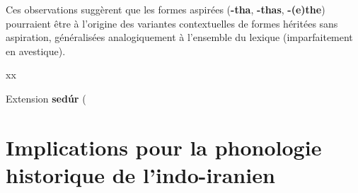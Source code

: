 \documentclass[oneside,a4paper,11pt]{article}
\newcommand{\ipa}[1]{{\phon\mbox{\textbf{#1}}}}
\begin{document}
Ces observations suggèrent que les formes aspirées (\ipa{-tha}, \ipa{-thas}, \ipa{-(e)the}) pourraient être à l'origine des variantes contextuelles de formes héritées sans aspiration, généralisées analogiquement à l'ensemble du lexique (imparfaitement en avestique).

xx

Extension \ipa{sedúr} (\citealt[342-3]{burrow55skt}
\section{Implications pour la phonologie historique de l'indo-iranien}





\end{document}
